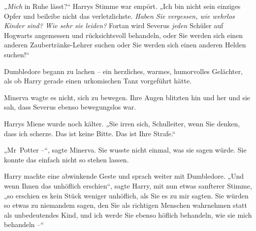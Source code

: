 „\emph{Mich} in Ruhe lässt?“ Harrys Stimme war empört. „Ich bin nicht sein einziges Opfer und beileibe nicht das verletzlichste. \emph{Haben Sie vergessen, wie wehrlos Kinder sind? Wie sehr sie leiden?} Fortan wird Severus \emph{jeden} Schüler auf Hogwarts angemessen und rücksichtsvoll behandeln, oder Sie werden sich einen anderen Zaubertränke-Lehrer suchen oder Sie werden sich einen anderen Helden suchen!“ 

Dumbledore begann zu lachen – ein herzliches, warmes, humorvolles Gelächter, als ob Harry gerade einen urkomischen Tanz vorgeführt hätte. 

Minerva wagte es nicht, sich zu bewegen. Ihre Augen blitzten hin und her und sie sah, dass Severus ebenso bewegungslos war. 

Harrys Miene wurde noch kälter. „Sie irren sich, Schulleiter, wenn Sie denken, dass ich scherze. Das ist keine Bitte. Das ist Ihre Strafe.“ 

„Mr~Potter –“, sagte Minerva. Sie wusste nicht einmal, was sie sagen würde. Sie konnte das einfach nicht so stehen lassen. 

Harry machte eine abwinkende Geste und sprach weiter mit Dumbledore. „Und wenn Ihnen das unhöflich erschien“, sagte Harry, mit nun etwas sanfterer Stimme, „so erschien es kein Stück weniger unhöflich, als Sie es zu mir sagten. Sie würden so etwas zu niemandem sagen, den Sie als richtigen Menschen wahrnehmen statt als unbedeutendes Kind, und ich werde Sie ebenso höflich behandeln, wie sie mich behandeln –“ 

